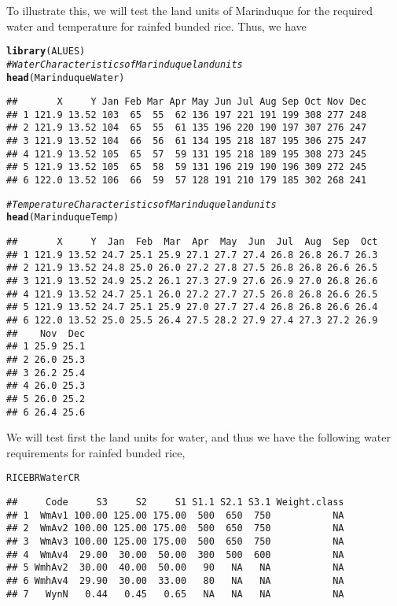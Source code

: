 \documentclass[11pt,fleqn]{article}\usepackage[]{graphicx}\usepackage[]{color}
\makeatletter
\newcommand{\hlcom}[1]{\textcolor[rgb]{0.678,0.584,0.686}{\textit{#1}}}%
\newcommand{\hlstd}[1]{\textcolor[rgb]{0.345,0.345,0.345}{#1}}%
\newcommand{\hlkwd}[1]{\textcolor[rgb]{0.737,0.353,0.396}{\textbf{#1}}}%
\newenvironment{kframe}{%
 \def\at@end@of@kframe{}%
 \ifinner\ifhmode%
  \def\at@end@of@kframe{\end{minipage}}%
  \begin{minipage}{\columnwidth}%
 \fi\fi%
 \def\FrameCommand##1{\hskip\@totalleftmargin \hskip-\fboxsep
 \colorbox{shadecolor}{##1}\hskip-\fboxsep
     \hskip-\linewidth \hskip-\@totalleftmargin \hskip\columnwidth}%
 \MakeFramed {\advance\hsize-\width
   \@totalleftmargin\z@ \linewidth\hsize
   \@setminipage}}%
 {\par\unskip\endMakeFramed%
 \at@end@of@kframe}
\newenvironment{knitrout}{}{} %
\makeatother
\begin{document}
To illustrate this, we will test the land units of Marinduque for the required water and temperature for rainfed bunded rice. Thus, we have
\begin{knitrout}
\color{fgcolor}\begin{kframe}
\begin{alltt}
\hlkwd{library}\hlstd{(ALUES)}
\hlcom{# Water Characteristics of Marinduque land units}
\hlkwd{head}\hlstd{(MarinduqueWater)}
\end{alltt}
\begin{verbatim}
##       X     Y Jan Feb Mar Apr May Jun Jul Aug Sep Oct Nov Dec
## 1 121.9 13.52 103  65  55  62 136 197 221 191 199 308 277 248
## 2 121.9 13.52 104  65  55  61 135 196 220 190 197 307 276 247
## 3 121.9 13.52 104  66  56  61 134 195 218 187 195 306 275 247
## 4 121.9 13.52 105  65  57  59 131 195 218 189 195 308 273 245
## 5 121.9 13.52 105  65  58  59 131 196 219 190 196 309 272 245
## 6 122.0 13.52 106  66  59  57 128 191 210 179 185 302 268 241
\end{verbatim}
\begin{alltt}
\hlcom{# Temperature Characteristics of Marinduque land units}
\hlkwd{head}\hlstd{(MarinduqueTemp)}
\end{alltt}
\begin{verbatim}
##       X     Y  Jan  Feb  Mar  Apr  May  Jun  Jul  Aug  Sep  Oct
## 1 121.9 13.52 24.7 25.1 25.9 27.1 27.7 27.4 26.8 26.8 26.7 26.3
## 2 121.9 13.52 24.8 25.0 26.0 27.2 27.8 27.5 26.8 26.8 26.6 26.5
## 3 121.9 13.52 24.9 25.2 26.1 27.3 27.9 27.6 26.9 27.0 26.8 26.6
## 4 121.9 13.52 24.7 25.1 26.0 27.2 27.7 27.5 26.8 26.8 26.6 26.5
## 5 121.9 13.52 24.7 25.1 25.9 27.0 27.7 27.4 26.8 26.8 26.6 26.4
## 6 122.0 13.52 25.0 25.5 26.4 27.5 28.2 27.9 27.4 27.3 27.2 26.9
##    Nov  Dec
## 1 25.9 25.1
## 2 26.0 25.3
## 3 26.2 25.4
## 4 26.0 25.3
## 5 26.0 25.2
## 6 26.4 25.6
\end{verbatim}
\end{kframe}
\end{knitrout}
We will test first the land units for water, and thus we have the following water requirements for rainfed bunded rice,
\begin{knitrout}
\color{fgcolor}\begin{kframe}
\begin{alltt}
\hlstd{RICEBRWaterCR}
\end{alltt}
\begin{verbatim}
##     Code     S3     S2     S1 S1.1 S2.1 S3.1 Weight.class
## 1  WmAv1 100.00 125.00 175.00  500  650  750           NA
## 2  WmAv2 100.00 125.00 175.00  500  650  750           NA
## 3  WmAv3 100.00 125.00 175.00  500  650  750           NA
## 4  WmAv4  29.00  30.00  50.00  300  500  600           NA
## 5 WmhAv2  30.00  40.00  50.00   90   NA   NA           NA
## 6 WmhAv4  29.90  30.00  33.00   80   NA   NA           NA
## 7   WynN   0.44   0.45   0.65   NA   NA   NA           NA
\end{verbatim}
\end{kframe}
\end{knitrout}
\end{document}
